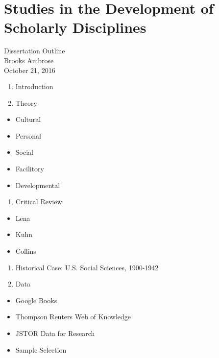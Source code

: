 \documentclass[]{article}
\date{}
\providecommand{\tightlist}{%
  \setlength{\itemsep}{0pt}\setlength{\parskip}{0pt}}
\begin{document}
\section{Studies in the Development of Scholarly
Disciplines}\label{studies-in-the-development-of-scholarly-disciplines}

Dissertation Outline\\
Brooks Ambrose\\
October 21, 2016

\begin{enumerate}
\def\labelenumi{\arabic{enumi}.}
\tightlist
\item
  Introduction
\item
  Theory\\
\end{enumerate}

\begin{itemize}
\tightlist
\item
  Cultural\\
\item
  Personal\\
\item
  Social\\
\item
  Facilitory\\
\item
  Developmental\\
\end{itemize}

\begin{enumerate}
\def\labelenumi{\arabic{enumi}.}
\setcounter{enumi}{2}
\tightlist
\item
  Critical Review
\end{enumerate}

\begin{itemize}
\tightlist
\item
  Lena
\item
  Kuhn
\item
  Collins
\end{itemize}

\begin{enumerate}
\def\labelenumi{\arabic{enumi}.}
\setcounter{enumi}{3}
\tightlist
\item
  Historical Case: U.S. Social Sciences, 1900-1942
\item
  Data
\end{enumerate}

\begin{itemize}
\tightlist
\item
  Google Books
\item
  Thompson Reuters Web of Knowledge
\item
  JSTOR Data for Research
\item
  Sample Selection
\end{itemize}
\end{document}
